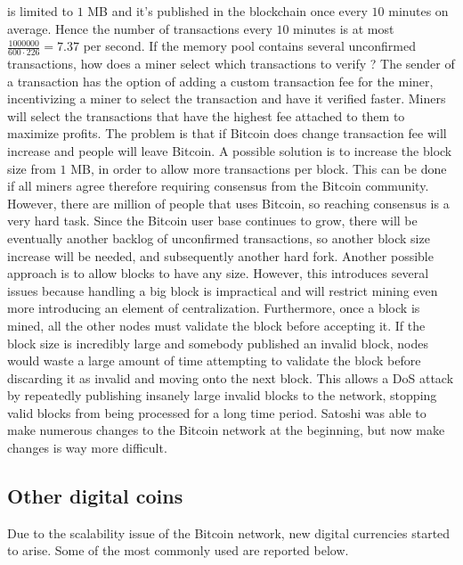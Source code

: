 is limited to $1$ MB and it's published in the blockchain once every $10$ minutes on average. Hence the number of transactions every $10$ minutes is at most $\frac{1000000}{600 \cdot 226} = 7.37$ per second. If the memory pool contains several unconfirmed transactions, how does a miner select which transactions to verify ? The sender of a transaction has the option of adding a custom transaction fee for the miner, incentivizing a miner to select the transaction and have it verified faster. Miners will select the transactions that have the highest fee attached to them to maximize profits. The problem is that if Bitcoin does change transaction fee will increase and people will leave Bitcoin. A possible solution is to increase the block size from $1$ MB, in order to allow more transactions per block. This can be done if all miners agree therefore requiring consensus from the Bitcoin community. However, there are million of people that uses Bitcoin, so reaching consensus is a very hard task. Since the Bitcoin user base continues to grow, there will be eventually another backlog of unconfirmed transactions, so another block size increase will be needed, and subsequently another hard fork. Another possible approach is to allow blocks to have any size. However, this introduces several issues because handling a big block is impractical and will restrict mining even more introducing an element of centralization. Furthermore, once a block is mined, all the other nodes must validate the block before accepting it. If the block size is incredibly large and somebody published an invalid block, nodes would waste a large amount of time attempting to validate the block before discarding it as invalid and moving onto the next block. This allows a DoS attack by repeatedly publishing insanely large invalid blocks to the network, stopping valid blocks from being processed for a long time period. Satoshi was able to make numerous changes to the Bitcoin network at the beginning, but now make changes is way more difficult. 

\subsection{Other digital coins}
Due to the scalability issue of the Bitcoin network, new digital currencies started to arise. Some of the most commonly used are reported below.

